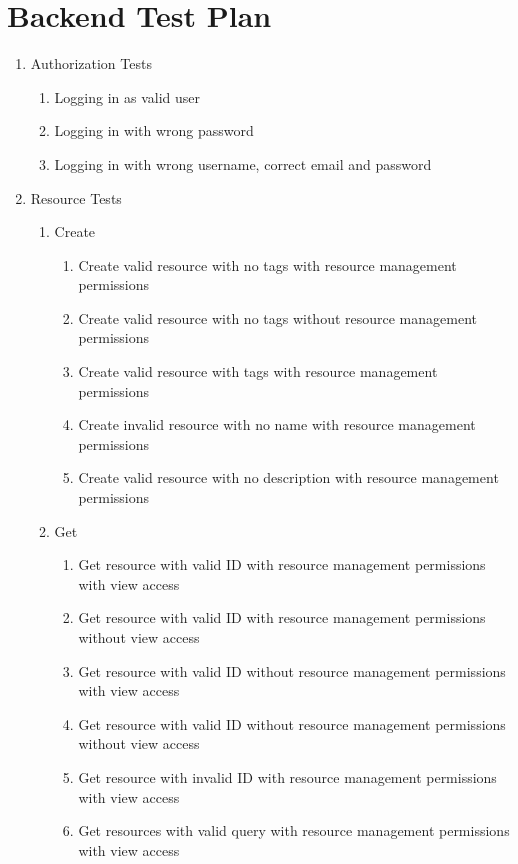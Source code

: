 \documentclass[12pt]{article}
\begin{document}
\section{Backend Test Plan}
\label{appendix:backendtest}
\begin{enumerate}
    \item Authorization Tests
    \begin{enumerate}
        \item Logging in as valid user
        \item Logging in with wrong password
        \item Logging in with wrong username, correct email and password
    \end{enumerate}
    \item Resource Tests
    \begin{enumerate}
        \item Create
        \begin{enumerate}
            \item Create valid resource with no tags with resource management permissions
            \item Create valid resource with no tags without resource management permissions
            \item Create valid resource with tags with resource management permissions
            \item Create invalid resource with no name with resource management permissions
            \item Create valid resource with no description with resource management permissions
        \end{enumerate}
        \item Get
        \begin{enumerate}
            \item Get resource with valid ID with resource management permissions with view access
            \item Get resource with valid ID with resource management permissions without view access
            \item Get resource with valid ID without resource management permissions with view access
            \item Get resource with valid ID without resource management permissions without view access
            \item Get resource with invalid ID with resource management permissions with view access
            \item Get resources with valid query with resource management permissions with view access

\end{enumerate}
\end{enumerate}
\end{enumerate}
\end{document}
